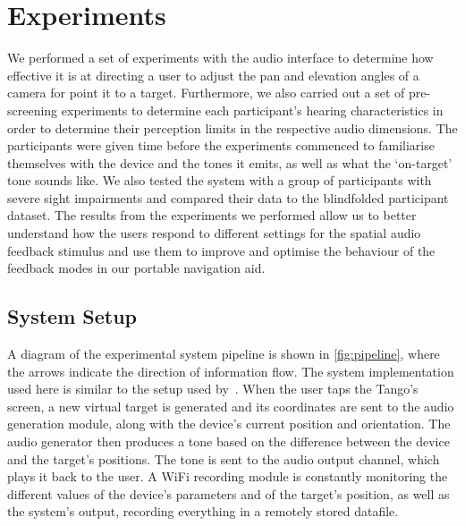 \documentclass[acmsmall]{acmart}
\begin{document}
\section{Experiments}\label{sec:experiments}

We performed a set of experiments with the audio interface to determine how effective it is at directing a user to adjust the pan and elevation angles of a camera for point it to a target.
Furthermore, we also carried out a set of pre-screening experiments to determine each participant's hearing characteristics in order to determine their perception limits in the respective audio dimensions.
The participants were given time before the experiments commenced to familiarise themselves with the device and the tones it emits, as well as what the `on-target' tone sounds like.
We also tested the system with a group of participants with severe sight impairments and compared their data to the blindfolded participant dataset.
The results from the experiments we performed allow us to better understand how the users respond to different settings for the spatial audio feedback stimulus and use them to improve and optimise the behaviour of the feedback modes in our portable navigation aid.

\subsection{System Setup}

A diagram of the experimental system pipeline is shown in \cref{fig:pipeline}, where the arrows indicate the direction of information flow.
The system implementation used here is similar to the setup used by~\citet{lock2019bone}.
When the user taps the Tango's screen, a new virtual target is generated and its coordinates are sent to the audio generation module, along with the device's current position and orientation.
The audio generator then produces a tone based on the difference between the device and the target's positions.
The tone is sent to the audio output channel, which plays it back to the user.
A WiFi recording module is constantly monitoring the different values of the device's parameters and of the target's position, as well as the system's output, recording everything in a remotely stored datafile. 
\end{document}

